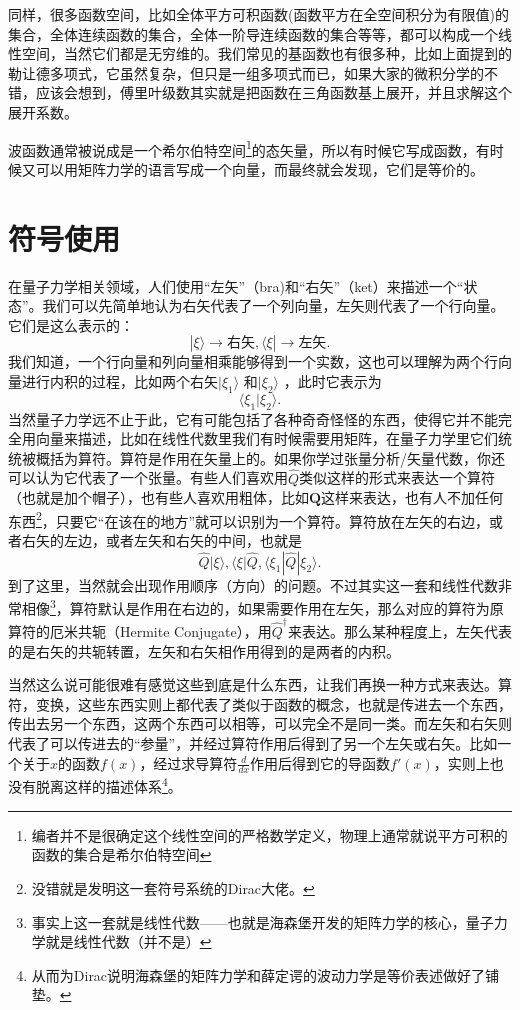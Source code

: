 \documentclass[12pt,a4paper,openany,twoside]{book}
\numberwithin{equation}{section}
\begin{document}
    同样，很多函数空间，比如全体平方可积函数(函数平方在全空间积分为有限值)的集合，全体连续函数的集合，全体一阶导连续函数的集合等等，都可以构成一个线性空间，当然它们都是无穷维的。我们常见的基函数也有很多种，比如上面提到的勒让德多项式，它虽然复杂，但只是一组多项式而已，如果大家的微积分学的不错，应该会想到，傅里叶级数其实就是把函数在三角函数基上展开，并且求解这个展开系数。
    
    波函数通常被说成是一个希尔伯特空间\footnote{编者并不是很确定这个线性空间的严格数学定义，物理上通常就说平方可积的函数的集合是希尔伯特空间}的态矢量，所以有时候它写成函数，有时候又可以用矩阵力学的语言写成一个向量，而最终就会发现，它们是等价的。
    
    \section{符号使用}
    在量子力学相关领域，人们使用``左矢''（bra)和``右矢''（ket）来描述一个``状态''。我们可以先简单地认为右矢代表了一个列向量，左矢则代表了一个行向量。它们是这么表示的：
    \[
    | \xi \rangle \rightarrow \text{右矢}, \langle \xi | \rightarrow \text{左矢}    
    .\]  
    我们知道，一个行向量和列向量相乘能够得到一个实数，这也可以理解为两个行向量进行内积的过程，比如两个右矢$| \xi_1 \rangle $ 和$| \xi_2 \rangle $ ，此时它表示为
    \[
    \langle \xi_1 | \xi_2 \rangle 
    .\] 
    当然量子力学远不止于此，它有可能包括了各种奇奇怪怪的东西，使得它并不能完全用向量来描述，比如在线性代数里我们有时候需要用矩阵，在量子力学里它们统统被概括为算符。算符是作用在矢量上的。如果你学过张量分析/矢量代数，你还可以认为它代表了一个张量。有些人们喜欢用$\hat{Q}$类似这样的形式来表达一个算符（也就是加个帽子），也有些人喜欢用粗体，比如$\mathbf{Q}$这样来表达，也有人不加任何东西\footnote{没错就是发明这一套符号系统的\Large{Dirac}大佬。}，只要它``在该在的地方''就可以识别为一个算符。算符放在左矢的右边，或者右矢的左边，或者左矢和右矢的中间，也就是
    \[
    \hat{Q}| \xi \rangle ,\langle \xi | \hat{Q}, \langle \xi_1 | \hat{Q} | \xi_2 \rangle   
    .\] 
    到了这里，当然就会出现作用顺序（方向）的问题。不过其实这一套和线性代数非常相像\footnote{事实上这一套就是线性代数——也就是海森堡开发的矩阵力学的核心，量子力学就是线性代数（并不是）}，算符默认是作用在右边的，如果需要作用在左矢，那么对应的算符为原算符的厄米共轭（Hermite Conjugate），用$\hat{Q}^\dagger$来表达。那么某种程度上，左矢代表的是右矢的共轭转置，左矢和右矢相作用得到的是两者的内积。

    当然这么说可能很难有感觉这些到底是什么东西，让我们再换一种方式来表达。算符，变换，这些东西实则上都代表了类似于函数的概念，也就是传进去一个东西，传出去另一个东西，这两个东西可以相等，可以完全不是同一类。而左矢和右矢则代表了可以传进去的``参量''，并经过算符作用后得到了另一个左矢或右矢。比如一个关于$x$的函数$f(x)$，经过求导算符$\frac{d }{d x} $作用后得到它的导函数$f'(x)$，实则上也没有脱离这样的描述体系\footnote{从而为Dirac说明海森堡的矩阵力学和薛定谔的波动力学是等价表述做好了铺垫。}。
\end{document}
